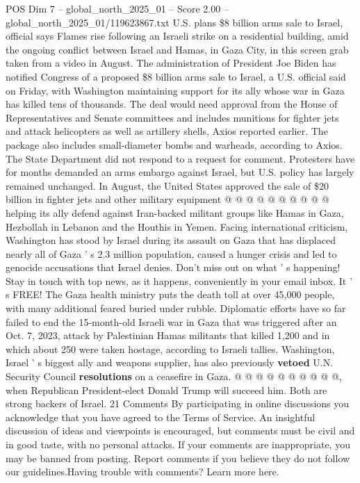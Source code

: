 \begin{textsample}{POS Dim 7 – global\_north\_2025\_01 – Score 2.00 – global\_north\_2025\_01/119623867.txt}  \label{ex:f7_pos_394}
U.S. plans \$8 billion arms sale to Israel, official says Flames rise following an Israeli strike on a residential building, amid the ongoing conflict between Israel and Hamas, in Gaza City, in this screen grab taken from a video in August.
The administration of President Joe Biden has notified Congress of a proposed \$8 billion arms sale to Israel, a U.S. official said on Friday, with Washington maintaining support for its ally whose war in Gaza has killed tens of thousands.
The deal would need approval from the House of Representatives and Senate committees and includes munitions for fighter jets and attack helicopters as well as artillery shells, Axios reported earlier.
The package also includes small-diameter bombs and warheads, according to Axios.
The State Department did not respond to a request for comment.
Protesters have for months demanded an arms embargo against Israel, but U.S. policy has largely remained unchanged.
In August, the United States approved the sale of \$20 billion in fighter jets and other military equipment @ @ @ @ @ @ @ @ @ @ helping its ally defend against Iran-backed militant groups like Hamas in Gaza, Hezbollah in Lebanon and the Houthis in Yemen.
Facing international criticism, Washington has stood by Israel during its assault on Gaza that has displaced nearly all of Gaza ' s 2.3 million population, caused a hunger crisis and led to genocide accusations that Israel denies.
Don't miss out on what ' s happening!
Stay in touch with top news, as it happens, conveniently in your email inbox.
It ' s FREE!
The Gaza health ministry puts the death toll at over 45,000 people, with many additional feared buried under rubble.
Diplomatic efforts have so far failed to end the 15-month-old Israeli war in Gaza that was triggered after an Oct. 7, 2023, attack by Palestinian Hamas militants that killed 1,200 and in which about 250 were taken hostage, according to Israeli tallies.
Washington, Israel ' s biggest ally and weapons supplier, has also previously \textbf{vetoed} U.N.
Security Council \textbf{resolutions} on a ceasefire in Gaza. @ @ @ @ @ @ @ @ @ @, when Republican President-elect Donald Trump will succeed him.
Both are strong backers of Israel. 21 Comments By participating in online discussions you acknowledge that you have agreed to the Terms of Service.
An insightful discussion of ideas and viewpoints is encouraged, but comments must be civil and in good taste, with no personal attacks.
If your comments are inappropriate, you may be banned from posting.
Report comments if you believe they do not follow our guidelines.Having trouble with comments?
Learn more here.

\end{textsample}
